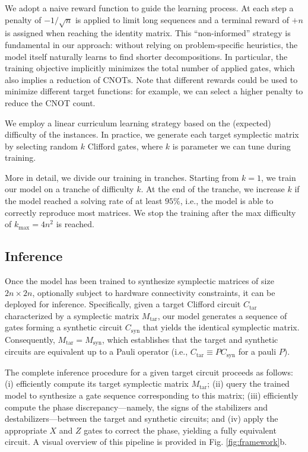 \documentclass[conference]{IEEEtran}
\newcommand{\CNOTs}{\ensuremath{\text{CNOTs}}\xspace}
\begin{document}
We adopt a naive reward function to guide the learning process. At each step a penalty of $-1/\sqrt{n}$ is applied to limit long sequences and a terminal reward of $+n$ is assigned when reaching the identity matrix. This ``non-informed'' strategy is fundamental in our approach: without relying on problem-specific heuristics, the model itself naturally learns to find shorter decompositions. In particular, the training objective implicitly minimizes the total number of applied gates, which also implies a reduction of \CNOTs. Note that different rewards could be used to minimize different target functions: for example, we can select a higher penalty to reduce the CNOT count. 

We employ a linear curriculum learning strategy \cite{bengio2009curriculumlearning} based on the (expected) difficulty of the instances. In practice, we generate each target symplectic matrix by selecting random $k$ Clifford gates, where $k$ is parameter we can tune during training. 

More in detail, we divide our training in tranches. Starting from $k=1$, we train our model on a tranche of difficulty $k$. At the end of the tranche, we increase $k$ if the model reached a solving rate of at least $95\%$, i.e., the model is able to correctly reproduce most matrices. We stop the training after the max difficulty of $k_{\max} = 4n^2$ is reached.





\subsection{Inference}
Once the model has been trained to synthesize symplectic matrices of size $2n\times2n$, optionally subject to hardware connectivity constraints, it can be deployed for inference. Specifically, given a target Clifford circuit $C_\text{tar}$ characterized by a symplectic matrix $M_\text{tar}$, our model generates a sequence of gates forming a synthetic circuit $C_\text{syn}$ that yields the identical symplectic matrix. Consequently, $M_\text{tar} = M_\text{syn}$, which establishes that the target and synthetic circuits are equivalent up to a Pauli operator (i.e., $C_\text{tar} \equiv P C_\text{syn}$ for a pauli $P$).


The complete inference procedure for a given target circuit proceeds as follows: (i) efficiently compute its target symplectic matrix $M_\text{tar}$; (ii) query the trained model to synthesize a gate sequence corresponding to this matrix; (iii) efficiently compute the phase discrepancy—namely, the signs of the stabilizers and destabilizers—between the target and synthetic circuits; and (iv) apply the appropriate $X$ and $Z$ gates to correct the phase, yielding a fully equivalent circuit. A visual overview of this pipeline is provided in Fig. \ref{fig:framework}b.
\end{document}
